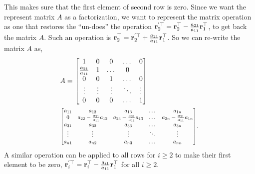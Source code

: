 \documentclass{article}
\begin{document}
This makes  sure   that  the  first element  of   second   row is zero.  Since
we  want  the    represent   matrix $A$   as a    factorization, we want to
represent the  matrix  operation as one   that   restores  the  ``un-does'' the
operation   $\mathbf{r}_2^{'\top}=\mathbf{r}_2^\top - \frac{a_{21}}{a_{11}}\mathbf{r}_1^\top$, to
get back  the  matrix $A$. Such
an  operation is  $\mathbf{r}_2^\top  =\mathbf{r}_2^{'\top}+
\frac{a_{21}}{a_{11}}\mathbf{r}_1^\top$.  So we  can  re-write the matrix  $A$ as,
%
\begin{align*}
  &A=\begin{bmatrix} 1  & 0  &  0 &  \dots  & 0 \\
    \frac{a_{21}}{a_{11}} & 1  & \dots  &   0  \\
    0 & 0  & 1 & \dots  &   0  \\
    \vdots  & \vdots &  \vdots  &   \ddots  &  \vdots   \\
    0 & 0 &  0   &  \dots  & 1
  \end{bmatrix}  \\
  &  \scalebox{0.8}{\mbox{$\begin{bmatrix}
        a_{11} & a_{12}  &  a_{13} &     \dots &  a_{1n} \\
        0 & a_{22}-\frac{a_{21}}{a_{11}}a_{12}  & a_{23}-\frac{a_{21}}{a_{11}}a_{13} &  \dots &  a_{2n} -\frac{a_{21}}{a_{11}}a_{1n}\\
        a_{31} & a_{32}  &  a_{33} &     \dots &  a_{3n} \\
        \vdots &  \vdots  & \vdots &  \ddots & \vdots \\
        a_{n1} & a_{n2}  &  a_{n3} &   \dots &  a_{nn}
      \end{bmatrix}$}}.
\end{align*}
%
A  similar  operation  can  be applied to  all rows for  $i \ge 2$ to make  their first element
to  be zero, $\mathbf{r}_i^{'\top} =  \mathbf{r}_i^\top  -\frac{a_{i1}}{a_{11}} \mathbf{r}_1^\top$
for all $i \ge 2$.
% 
\end{document}
